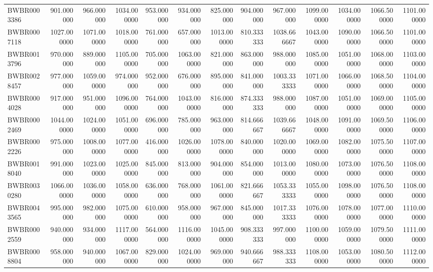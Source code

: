 \begin{longtable}{lrrrrrrrrrrrr}
BWBR0003386 & 901.000000 & 966.000000 & 1034.000000 & 953.000000 & 934.000000 & 825.000000 & 904.000000 & 967.000000 & 1099.000000 & 1034.000000 & 1066.500000 & 1101.000000 \\
BWBR0007118 & 1027.000000 & 1071.000000 & 1018.000000 & 761.000000 & 657.000000 & 1013.000000 & 810.333333 & 1038.666667 & 1043.000000 & 1090.000000 & 1066.500000 & 1101.000000 \\
BWBR0013796 & 970.000000 & 889.000000 & 1105.000000 & 705.000000 & 1063.000000 & 821.000000 & 863.000000 & 988.000000 & 1085.000000 & 1051.000000 & 1068.000000 & 1103.000000 \\
BWBR0028457 & 977.000000 & 1059.000000 & 974.000000 & 952.000000 & 676.000000 & 895.000000 & 841.000000 & 1003.333333 & 1071.000000 & 1066.000000 & 1068.500000 & 1104.000000 \\
BWBR0004028 & 917.000000 & 951.000000 & 1096.000000 & 764.000000 & 1043.000000 & 816.000000 & 874.333333 & 988.000000 & 1087.000000 & 1051.000000 & 1069.000000 & 1105.000000 \\
BWBR0002469 & 1044.000000 & 1024.000000 & 1051.000000 & 696.000000 & 785.000000 & 963.000000 & 814.666667 & 1039.666667 & 1048.000000 & 1091.000000 & 1069.500000 & 1106.000000 \\
BWBR0002226 & 975.000000 & 1008.000000 & 1077.000000 & 416.000000 & 1026.000000 & 1078.000000 & 840.000000 & 1020.000000 & 1069.000000 & 1082.000000 & 1075.500000 & 1107.000000 \\
BWBR0018040 & 991.000000 & 1023.000000 & 1025.000000 & 845.000000 & 813.000000 & 904.000000 & 854.000000 & 1013.000000 & 1080.000000 & 1073.000000 & 1076.500000 & 1108.000000 \\
BWBR0030280 & 1066.000000 & 1036.000000 & 1058.000000 & 636.000000 & 768.000000 & 1061.000000 & 821.666667 & 1053.333333 & 1055.000000 & 1098.000000 & 1076.500000 & 1108.000000 \\
BWBR0043565 & 995.000000 & 982.000000 & 1075.000000 & 610.000000 & 958.000000 & 967.000000 & 845.000000 & 1017.333333 & 1076.000000 & 1078.000000 & 1077.000000 & 1110.000000 \\
BWBR0002559 & 940.000000 & 934.000000 & 1117.000000 & 564.000000 & 1116.000000 & 1045.000000 & 908.333333 & 997.000000 & 1100.000000 & 1059.000000 & 1079.500000 & 1111.000000 \\
BWBR0008804 & 958.000000 & 940.000000 & 1067.000000 & 829.000000 & 1024.000000 & 969.000000 & 940.666667 & 988.333333 & 1108.000000 & 1053.000000 & 1080.500000 & 1112.000000 \\

\end{longtable}

